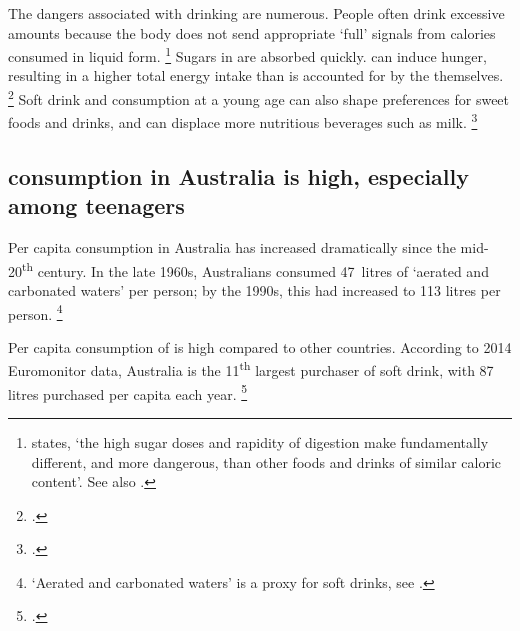 \documentclass[embargoed]{grattan}
\begin{document}
The dangers associated with drinking \SSBs{} are numerous.
People often drink excessive amounts because the body does not send appropriate `full' signals from calories consumed in liquid form.%
\footnote{\textcite{Mozaffarian2016politicssciencesoda} states, `the high sugar doses and rapidity of digestion make \SSBs{} fundamentally different, and more dangerous, than other foods and drinks of similar caloric content'.
See also \textcites{Fletcher2011Aresoftdrink}{Malik2006Intakesugarsweetened}{Ruyter2012trialsugarfree}{Johnson2009Dietarysugarsintake}{Gill2006weightevidencesuggests}{Panel2014POLICYBRIEFoptions}{Malik2010Sugarsweetenedbeverages}{Popkin2012Sugarybeveragesrepresent}{PublicHealth2016SugaryDrinks}{Health2013AustralianDietaryGuidelines}.} 
Sugars in \SSBs{} are absorbed quickly.
\SSBs{} can induce hunger, resulting in a higher total energy intake than is accounted for by the \SSBs{} themselves.%
\footcites{Vartanian2007Effectssoftdrink}{St-Onge2004Addedthermogenicsatiety} Soft drink and \SSB{} consumption at a young age can also shape preferences for sweet foods and drinks, and can displace more nutritious beverages such as milk.%
\footcites{Popkin2012Sugarybeveragesrepresent}{Malik2006Intakesugarsweetened}{Vartanian2007Effectssoftdrink}

\subsection{\SSB{} consumption in Australia is high, especially among teenagers}\label{ssb-consumption-in-australia-is-high-especially-among-teenagers}

Per capita \SSB{} consumption in Australia has increased dramatically since the mid-20\textsuperscript{th} century.
In the late 1960s, Australians consumed 47~litres of `aerated and carbonated waters' per person; by the 1990s, this had increased to 113 litres per person.%
\footnote{`Aerated and carbonated waters' is a proxy for soft drinks, see \textcite{ABS200043060Apparentconsumption}.}

Per capita consumption of \SSBs{} is high compared to other countries.
According to 2014 Euromonitor data, Australia is the 11\textsuperscript{th} largest purchaser of soft drink, with 87 litres purchased per capita each year.%
\footcites{Silver2015IdBuyEmerging}{Popkin2016Sweeteningglobaldiet}
\end{document}

